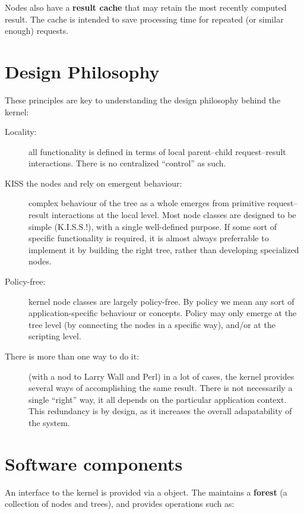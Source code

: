   Nodes also have a {\bf result cache} that may retain the most recently computed
  result. The cache is intended to save processing time for repeated (or similar
  enough) requests.

\section{Design Philosophy}

  These principles are key to understanding the design philosophy behind the
  kernel:

  \begin{description}

  \item[Locality:] all functionality is defined in terms of local parent--child
  request--result interactions. There is no centralized ``control'' as such.

  \item[KISS the nodes and rely on emergent behaviour:] complex behaviour of the
  tree as a whole emerges from primitive request--result interactions at the
  local level. Most node classes are designed to be simple (K.I.S.S.!), with a
  single well-defined purpose. If some sort of specific functionality is
  required, it is almost always preferrable to implement it by building the right
  tree, rather than developing specialized nodes.

  \item[Policy-free:] kernel node classes are largely policy-free. By policy we
  mean any sort of application-specific behaviour or concepts. Policy may only
  emerge at the tree level (by connecting the nodes in a specific way), and/or at
  the scripting level.

  \item[There is more than one way to do it:] (with a nod to Larry Wall and Perl)
  in a lot of cases, the kernel provides several ways of accomplishing the same 
  result. There is not necessarily a single ``right'' way, it all depends on the
  particular application context. This redundancy is by design, as it increases
  the overall adapatability of the system.

  \end{description}

\section{Software components}

  An interface to the kernel is provided via a  object. The
   maintains a {\bf forest} (a collection of nodes and trees), and
  provides operations such as:

